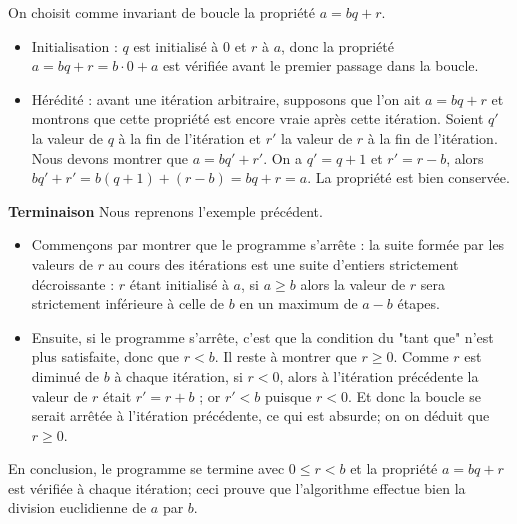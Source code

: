 On choisit comme invariant de boucle la propriété $a = bq + r$.

\ifprof
\begin{corrige}
\begin{itemize}
\item Initialisation : $q$ est initialisé à 0 et $r$ à $a$, donc la propriété $a = bq + r = b\cdot 0 + a$ est vérifiée avant le premier passage dans la boucle.
\item Hérédité : avant une itération arbitraire, supposons que l’on ait $a = bq + r$ et montrons que cette propriété est encore vraie après cette itération. Soient $q'$ la valeur de $q$ à la fin de l’itération et $r'$ la valeur de $r$ à la fin de l’itération. Nous devons montrer que $a = bq' + r'$. On a $q'= q + 1$ et $r' = r- b$, alors $bq' + r' = b(q + 1) + (r - b) = bq + r = a$. La propriété est bien conservée.
\end{itemize}


\textbf{Terminaison}
Nous reprenons l’exemple précédent.
\begin{itemize}
\item Commençons par montrer que le programme s’arrête : la suite formée par les valeurs de $r$ au cours
des itérations est une suite d’entiers strictement décroissante : $r$ étant initialisé à $a$, si $a \geq b$ alors
la valeur de $r$ sera strictement inférieure à celle de $b$ en un maximum de $a - b$ étapes.
\item Ensuite, si le programme s’arrête, c’est que la condition du "tant que" n’est plus satisfaite, donc
que $r < b$. Il reste à montrer que $r \geq 0$. Comme $r$ est diminué de $b$ à chaque itération, si $r < 0$,
alors à l’itération précédente la valeur de $r$ était $r' = r + b$ ; or $r' < b$ puisque $r < 0$. Et donc la
boucle se serait arrêtée à l’itération précédente, ce qui est absurde; on on déduit que $r \geq 0$.
\end{itemize}
En conclusion, le programme se termine avec $0 \leq r < b$ et la propriété $a = bq + r$ est vérifiée à chaque
itération; ceci prouve que l’algorithme effectue bien la division euclidienne de $a$ par $b$.
\end{corrige}
\else
\fi